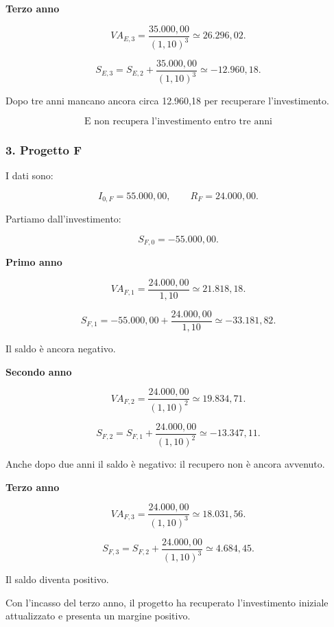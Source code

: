 \noindent \textbf{Terzo anno}

\[
VA_{E,3}
=
\frac{35.000{,}00}{(1{,}10)^3}
\simeq26.296{,}02.
\]

\[
S_{E,3}
=
S_{E,2}
+
\frac{35.000{,}00}{(1{,}10)^3}
\simeq
\boxed{-12.960{,}18}.
\]

\noindent Dopo tre anni
mancano ancora circa 12.960,18
per recuperare l'investimento.

\[
\boxed{
\text{E non recupera l'investimento entro tre anni}
}
\]


\subsubsection*{3. Progetto F}

\noindent I dati sono:

\[
I_{0,F}=55.000{,}00,
\qquad
R_F=24.000{,}00.
\]

\noindent Partiamo dall'investimento:

\[
S_{F,0}=-55.000{,}00.
\]

\medskip

\noindent \textbf{Primo anno}

\[
VA_{F,1}
=
\frac{24.000{,}00}{1{,}10}
\simeq21.818{,}18.
\]

\[
S_{F,1}
=
-55.000{,}00
+
\frac{24.000{,}00}{1{,}10}
\simeq
\boxed{-33.181{,}82}.
\]

\noindent Il saldo è ancora negativo.

\medskip

\noindent \textbf{Secondo anno}

\[
VA_{F,2}
=
\frac{24.000{,}00}{(1{,}10)^2}
\simeq19.834{,}71.
\]

\[
S_{F,2}
=
S_{F,1}
+
\frac{24.000{,}00}{(1{,}10)^2}
\simeq
\boxed{-13.347{,}11}.
\]

\noindent Anche dopo due anni
il saldo è negativo:
il recupero non è ancora avvenuto.

\medskip

\noindent \textbf{Terzo anno}

\[
VA_{F,3}
=
\frac{24.000{,}00}{(1{,}10)^3}
\simeq18.031{,}56.
\]

\[
S_{F,3}
=
S_{F,2}
+
\frac{24.000{,}00}{(1{,}10)^3}
\simeq
\boxed{4.684{,}45}.
\]

\noindent Il saldo diventa positivo.

\noindent Con l'incasso del terzo anno,
il progetto ha recuperato
l'investimento iniziale attualizzato
e presenta un margine positivo.

